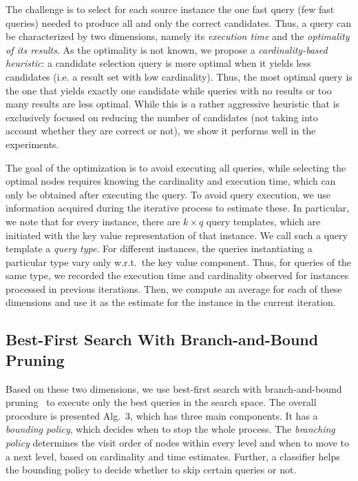 The challenge is to select for each source instance the one fast query (few fast queries) needed to produce all and only the correct candidates. Thus, a query can be characterized by two dimensions, namely its \emph{execution time} and the \emph{optimality of its results}. As the optimality is not known, we propose a \emph{cardinality-based heuristic}: a candidate selection query is more optimal when it yields less candidates (i.e. a result set with low cardinality). Thus, the most optimal query is the one that yields exactly one candidate while queries with no results or too many results are less optimal. While this is a rather aggressive heuristic that is exclusively focused on reducing the number of candidates (not taking into account whether they are correct or not), we show it performs well in the experiments. 

The goal of the optimization is to avoid executing all queries, while selecting the optimal nodes requires knowing the cardinality and execution time, which can only be obtained after executing the query. To avoid query execution, we use information acquired during the iterative process to estimate these. In particular, we note that for every instance, there are $k \times q$ query templates, which are initiated with the key value representation of that instance. We call such a query template a \emph{query type}. For different instances, the queries instantiating a particular type vary only w.r.t.~the key value component. Thus, for queries of the same type, we recorded the execution time and cardinality observed for instances processed in previous iterations. Then, we compute an average for each of these dimensions and use it as the estimate for the instance in the current iteration. 
 

\subsection{Best-First Search With Branch-and-Bound Pruning} 
Based on these two dimensions, we use best-first search with branch-and-bound pruning~\cite{DBLP:journals/jacm/DechterP85} to execute only the best queries in the search space. The overall procedure is presented Alg.~3, which has three main components. It has a \emph{bounding policy}, which decides when to stop the whole process. The \emph{branching policy} determines the visit order of nodes within every level and when to move to a next level, based on cardinality and time estimates. Further, a classifier helps the bounding policy to decide whether to skip certain queries or not. 

